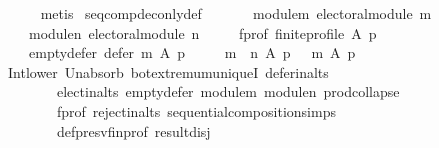 \begin{isabellebody}
\ \ \ \ \isamarkupfalse%
\ metis\isanewline
{}\isamarkupfalse%
%
\endisatagproof
{\isafoldproof}%
%
\isadelimproof
%
\endisadelimproof
%
\isadelimdocument
%
\endisadelimdocument
%
\isatagdocument
%
\isamarkuptrue%
%
\endisatagdocument
{\isafolddocument}%
%
\isadelimdocument
%
\endisadelimdocument
{}\isamarkupfalse%
\ seq{\isacharunderscore}{\kern0pt}comp{\isacharunderscore}{\kern0pt}dec{\isacharunderscore}{\kern0pt}only{\isacharunderscore}{\kern0pt}def{\isacharcolon}{\kern0pt}\isanewline
\ \ \isanewline
\ \ \ \ module{\isacharunderscore}{\kern0pt}m{\isacharcolon}{\kern0pt}\ {\isachardoublequoteopen}electoral{\isacharunderscore}{\kern0pt}module\ m{\isachardoublequoteclose}\ \isanewline
\ \ \ \ module{\isacharunderscore}{\kern0pt}n{\isacharcolon}{\kern0pt}\ {\isachardoublequoteopen}electoral{\isacharunderscore}{\kern0pt}module\ n{\isachardoublequoteclose}\ \isanewline
\ \ \ \ f{\isacharunderscore}{\kern0pt}prof{\isacharcolon}{\kern0pt}\ {\isachardoublequoteopen}finite{\isacharunderscore}{\kern0pt}profile\ A\ p{\isachardoublequoteclose}\ \isanewline
\ \ \ \ empty{\isacharunderscore}{\kern0pt}defer{\isacharcolon}{\kern0pt}\ {\isachardoublequoteopen}defer\ m\ A\ p\ {\isacharequal}{\kern0pt}\ {\isacharbraceleft}{\kern0pt}{\isacharbraceright}{\kern0pt}{\isachardoublequoteclose}\isanewline
\ \ \ {\isachardoublequoteopen}{\isacharparenleft}{\kern0pt}m\ {\isasymtriangleright}\ n{\isacharparenright}{\kern0pt}\ A\ p\ {\isacharequal}{\kern0pt}\ \ m\ A\ p{\isachardoublequoteclose}\isanewline
%
\isadelimproof
\ \ %
\endisadelimproof
%
\isatagproof
{}\isamarkupfalse%
\ Int{\isacharunderscore}{\kern0pt}lower{}\ Un{\isacharunderscore}{\kern0pt}absorb{}\ bot{\isachardot}{\kern0pt}extremum{\isacharunderscore}{\kern0pt}uniqueI\ defer{\isacharunderscore}{\kern0pt}in{\isacharunderscore}{\kern0pt}alts\isanewline
\ \ \ \ \ \ \ \ elect{\isacharunderscore}{\kern0pt}in{\isacharunderscore}{\kern0pt}alts\ empty{\isacharunderscore}{\kern0pt}defer\ module{\isacharunderscore}{\kern0pt}m\ module{\isacharunderscore}{\kern0pt}n\ prod{\isachardot}{\kern0pt}collapse\isanewline
\ \ \ \ \ \ \ \ f{\isacharunderscore}{\kern0pt}prof\ reject{\isacharunderscore}{\kern0pt}in{\isacharunderscore}{\kern0pt}alts\ sequential{\isacharunderscore}{\kern0pt}composition{\isachardot}{\kern0pt}simps\isanewline
\ \ \ \ \ \ \ \ def{\isacharunderscore}{\kern0pt}presv{\isacharunderscore}{\kern0pt}fin{\isacharunderscore}{\kern0pt}prof\ result{\isacharunderscore}{\kern0pt}disj\isanewline

\end{isabellebody}
